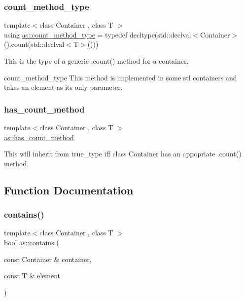 \subsubsection{\texorpdfstring{count\+\_\+method\+\_\+type}{count\_method\_type}}
{\footnotesize\ttfamily template$<$class Container , class T $>$ \\
using \hyperlink{namespaceas_a9bd788709567003423247a9db4ba1074}{as\+::count\+\_\+method\+\_\+type} = typedef decltype(std\+::declval$<$Container$>$().count(std\+::declval$<$T$>$()))}



This is the type of a generic .count() method for a container. 

count\+\_\+method\+\_\+type This method is implemented in some stl containers and takes an element as its only parameter. \mbox{\label{namespaceas_a9e0fcaa3ddb46647d8979282465685da}} 
\subsubsection{\texorpdfstring{has\+\_\+count\+\_\+method}{has\_count\_method}}
{\footnotesize\ttfamily template$<$class Container , class T $>$ \\
\hyperlink{namespaceas_a9e0fcaa3ddb46647d8979282465685da}{as\+::has\+\_\+count\+\_\+method}}



This will inherit from true\+\_\+type iff class Container has an appopriate .count() method. 



\subsection{Function Documentation}
\mbox{\label{namespaceas_a49cf7ae4239ab51e54f099d30a84811a}} 
\subsubsection{\texorpdfstring{contains()}{contains()}}
{\footnotesize\ttfamily template$<$class Container , class T $>$ \\
bool as\+::contains (\begin{DoxyParamCaption}\item[{const Container \&}]{container,  }\item[{const T \&}]{element }\end{DoxyParamCaption})\hspace{0.3cm}{\ttfamily [inline]}}



